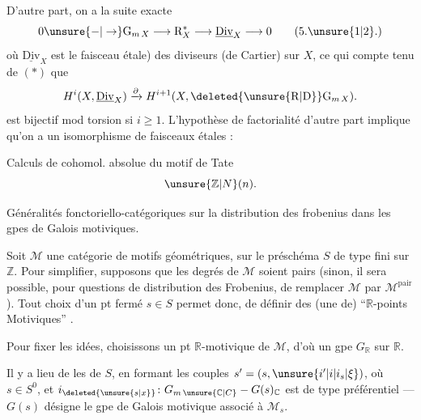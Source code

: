 D'autre part,  on a la suite exacte
\[
0\unsure{-|\to}\mathrm{G}_{m\,X}\longrightarrow\mathrm{R}_X^*\longrightarrow\underline{\mathrm{Div}}_X\longrightarrow0\tag*{(5.\unsure{1|2}.)}
\]
où $\underline{\mathrm{Div}}_X$ est le faisceau  étale) des diviseurs (de Cartier) sur $X$, ce qui   compte tenu de $(*)$ que
\[
H^{i}(X,\underline{\mathrm{Div}}_X)\xrightarrow{\partial}H^{i+1}(X,\deleted{\unsure{\mathrm{R}|\mathrm{D}}}\mathrm{G}_{m\,X}).
\]
est bijectif mod torsion  si $i\geq1$.  L'hypothèse de factorialité d'autre part implique  qu'on a un isomorphisme de faisceaux étales :


Calculs de cohomol. absolue du motif de Tate
\[
\unsure{\mathbb{Z}|N}(n).
\]


Généralités fonctoriello-catégoriques sur la distribution des frobenius dans les gpes de Galois motiviques.


Soit $\mathcal M$ une catégorie de motifs géométriques,  sur le préschéma $S$ de type fini sur $\mathbb Z$. Pour simplifier, supposons que les degrés de $\mathcal M$ soient pairs (sinon, il sera possible, pour   questions de distribution des Frobenius, de remplacer $\mathcal M$ par $\mathcal M^{\mathrm{pair}}$). Tout choix d'un pt fermé $s\in S$ permet donc, de définir des (une  de) ``$\mathbb R$-points Motiviques''  .

Pour fixer les idées, choisissons un pt $\mathbb R$-motivique de $\mathcal M$, d'où un gpe  $G_{\mathbb R}$ sur $\mathbb R$.

Il y a lieu de   les   de $S$, en formant les couples $s'=(s,\unsure{i'|i|i_s|\xi})$, où $s\in S^0$, et
$i_{\deleted{\unsure{s|x}}}\colon G_{m\,\unsure{\mathbb C|C}}-G(s)_{\mathbb C}$ est de type  préférentiel --- $G(s)$ désigne le gpe de Galois motivique associé à $\mathcal M_s$.

